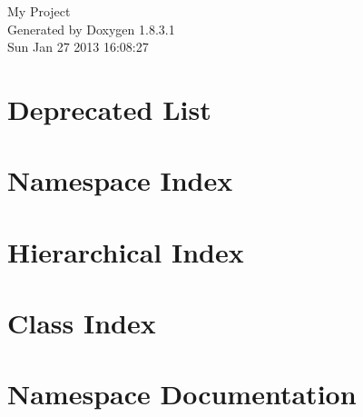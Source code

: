 \documentclass{book}
\begin{document}
\hypersetup{pageanchor=false,citecolor=blue}
\begin{titlepage}
\vspace*{7cm}
\begin{center}
{\Large My Project }\\
\vspace*{1cm}
{\large Generated by Doxygen 1.8.3.1}\\
\vspace*{0.5cm}
{\small Sun Jan 27 2013 16:08:27}\\
\end{center}
\end{titlepage}
\clearemptydoublepage
{}
\tableofcontents
\clearemptydoublepage
{}
\hypersetup{pageanchor=true,citecolor=blue}
\chapter{Deprecated List}
\label{deprecated}
\hypertarget{deprecated}{}

\chapter{Namespace Index}

\chapter{Hierarchical Index}

\chapter{Class Index}

\chapter{Namespace Documentation}








\end{document}
